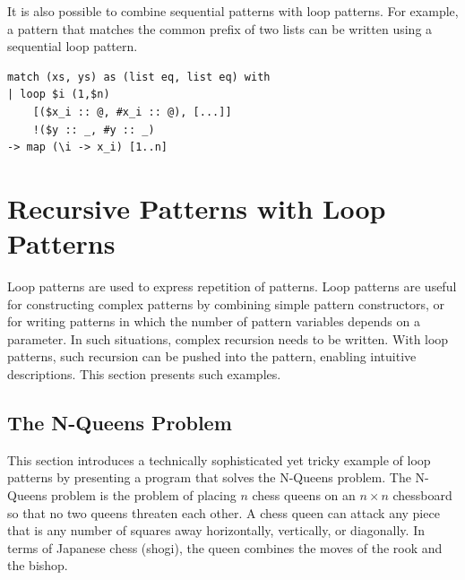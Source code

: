 It is also possible to combine sequential patterns with loop patterns.
For example, a pattern that matches the common prefix of two lists can be written using a sequential loop pattern.
\begin{lstlisting}[language=egison,numbers=none]
match (xs, ys) as (list eq, list eq) with
| loop $i (1,$n)
    [($x_i :: @, #x_i :: @), [...]]
    !($y :: _, #y :: _)
-> map (\i -> x_i) [1..n]
\end{lstlisting}

\section{Recursive Patterns with Loop Patterns}\label{pmo-loop}

Loop patterns are used to express repetition of patterns.
Loop patterns are useful for constructing complex patterns by combining simple pattern constructors, or for writing patterns in which the number of pattern variables depends on a parameter.
In such situations, complex recursion needs to be written.
With loop patterns, such recursion can be pushed into the pattern, enabling intuitive descriptions.
This section presents such examples.

\subsection{The N-Queens Problem}\label{pmo-loop-nqueen}

This section introduces a technically sophisticated yet tricky example of loop patterns by presenting a program that solves the N-Queens problem.
The N-Queens problem is the problem of placing $n$ chess queens on an $n \times n$ chessboard so that no two queens threaten each other.
A chess queen can attack any piece that is any number of squares away horizontally, vertically, or diagonally.
In terms of Japanese chess (shogi), the queen combines the moves of the rook and the bishop.

